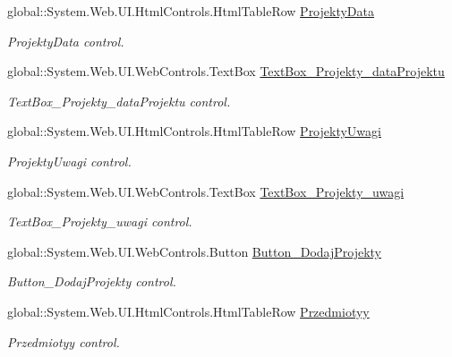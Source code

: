\begin{DoxyCompactItemize}
global\+::\+System.\+Web.\+U\+I.\+Html\+Controls.\+Html\+Table\+Row \hyperlink{class_dziennik_ocen_web2_1_1_web_form1_a9aa72d2cb06ee8300309d0965ec7cea2}{Projekty\+Data}
\begin{DoxyCompactList}\small\item\em Projekty\+Data control. \end{DoxyCompactList}\item 
global\+::\+System.\+Web.\+U\+I.\+Web\+Controls.\+Text\+Box \hyperlink{class_dziennik_ocen_web2_1_1_web_form1_a2f98d4ead21263b9c611a81eecbcbd24}{Text\+Box\+\_\+\+Projekty\+\_\+data\+Projektu}
\begin{DoxyCompactList}\small\item\em Text\+Box\+\_\+\+Projekty\+\_\+data\+Projektu control. \end{DoxyCompactList}\item 
global\+::\+System.\+Web.\+U\+I.\+Html\+Controls.\+Html\+Table\+Row \hyperlink{class_dziennik_ocen_web2_1_1_web_form1_a27e330c18393285c8f2e61279dee5106}{Projekty\+Uwagi}
\begin{DoxyCompactList}\small\item\em Projekty\+Uwagi control. \end{DoxyCompactList}\item 
global\+::\+System.\+Web.\+U\+I.\+Web\+Controls.\+Text\+Box \hyperlink{class_dziennik_ocen_web2_1_1_web_form1_a43df52d8c914980d8f9a8b377884aa09}{Text\+Box\+\_\+\+Projekty\+\_\+uwagi}
\begin{DoxyCompactList}\small\item\em Text\+Box\+\_\+\+Projekty\+\_\+uwagi control. \end{DoxyCompactList}\item 
global\+::\+System.\+Web.\+U\+I.\+Web\+Controls.\+Button \hyperlink{class_dziennik_ocen_web2_1_1_web_form1_a9ed89f06b0fd85c351236961f0a4a353}{Button\+\_\+\+Dodaj\+Projekty}
\begin{DoxyCompactList}\small\item\em Button\+\_\+\+Dodaj\+Projekty control. \end{DoxyCompactList}\item 
global\+::\+System.\+Web.\+U\+I.\+Html\+Controls.\+Html\+Table\+Row \hyperlink{class_dziennik_ocen_web2_1_1_web_form1_a61d033c16d4ca718f004f15f153463dd}{Przedmiotyy}
\begin{DoxyCompactList}\small\item\em Przedmiotyy control. \end{DoxyCompactList}\item 

\end{DoxyCompactItemize}
